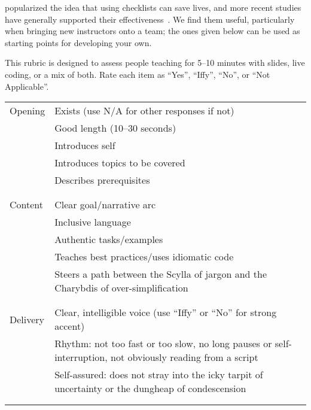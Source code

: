 
\cite{Gawa2007} popularized the idea that using checklists can save lives,
and more recent studies have generally supported their effectiveness~\cite{Avel2013,Urba2014,Rams2019}.
We find them useful,
particularly when bringing new instructors onto a team;
the ones given below can be used as starting points for developing your own.


This rubric is designed to assess people teaching for 5--10 minutes
with slides, live coding, or a mix of both.
Rate each item as ``Yes'', ``Iffy'', ``No'', or ``Not Applicable''.

\noindent
\begin{longtable}{p{}p{}}

  Opening
  & Exists (use N/A for other responses if not) \\
  & Good length (10--30 seconds) \\
  & Introduces self \\
  & Introduces topics to be covered \\
  & Describes prerequisites \\
  \\ [-1.5ex] \hline \\ [-1.5ex]

  Content
  & Clear goal/narrative arc \\
  & Inclusive language \\
  & Authentic tasks/examples \\
  & Teaches best practices/uses idiomatic code \\
  & Steers a path between the Scylla of jargon and the Charybdis of over-simplification \\
  \\ [-1.5ex] \hline \\ [-1.5ex]

  Delivery
  & Clear, intelligible voice (use ``Iffy'' or ``No'' for strong accent) \\
  & Rhythm: not too fast or too slow, no long pauses or self-interruption, not obviously reading from a script \\
  & Self-assured: does not stray into the icky tarpit of uncertainty or the dungheap of condescension \\
  \\ [-1.5ex] \hline \\ [-1.5ex]


\end{longtable}
